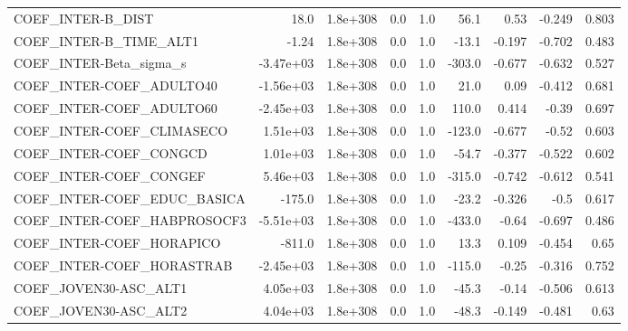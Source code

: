 \begin{tabular}{lrrrrrrrr}
COEF\_INTER-B\_DIST                 &        18.0 &     1.8e+308 &     0.0 &      1.0 &       56.1 &        0.53 &       -0.249 &         0.803 \\
COEF\_INTER-B\_TIME\_ALT1            &       -1.24 &     1.8e+308 &     0.0 &      1.0 &      -13.1 &      -0.197 &       -0.702 &         0.483 \\
COEF\_INTER-Beta\_sigma\_s           &   -3.47e+03 &     1.8e+308 &     0.0 &      1.0 &     -303.0 &      -0.677 &       -0.632 &         0.527 \\
COEF\_INTER-COEF\_ADULTO40          &   -1.56e+03 &     1.8e+308 &     0.0 &      1.0 &       21.0 &        0.09 &       -0.412 &         0.681 \\
COEF\_INTER-COEF\_ADULTO60          &   -2.45e+03 &     1.8e+308 &     0.0 &      1.0 &      110.0 &       0.414 &        -0.39 &         0.697 \\
COEF\_INTER-COEF\_CLIMASECO         &    1.51e+03 &     1.8e+308 &     0.0 &      1.0 &     -123.0 &      -0.677 &        -0.52 &         0.603 \\
COEF\_INTER-COEF\_CONGCD            &    1.01e+03 &     1.8e+308 &     0.0 &      1.0 &      -54.7 &      -0.377 &       -0.522 &         0.602 \\
COEF\_INTER-COEF\_CONGEF            &    5.46e+03 &     1.8e+308 &     0.0 &      1.0 &     -315.0 &      -0.742 &       -0.612 &         0.541 \\
COEF\_INTER-COEF\_EDUC\_BASICA       &      -175.0 &     1.8e+308 &     0.0 &      1.0 &      -23.2 &      -0.326 &         -0.5 &         0.617 \\
COEF\_INTER-COEF\_HABPROSOCF3       &   -5.51e+03 &     1.8e+308 &     0.0 &      1.0 &     -433.0 &       -0.64 &       -0.697 &         0.486 \\
COEF\_INTER-COEF\_HORAPICO          &      -811.0 &     1.8e+308 &     0.0 &      1.0 &       13.3 &       0.109 &       -0.454 &          0.65 \\
COEF\_INTER-COEF\_HORASTRAB         &   -2.45e+03 &     1.8e+308 &     0.0 &      1.0 &     -115.0 &       -0.25 &       -0.316 &         0.752 \\
COEF\_JOVEN30-ASC\_ALT1             &    4.05e+03 &     1.8e+308 &     0.0 &      1.0 &      -45.3 &       -0.14 &       -0.506 &         0.613 \\
COEF\_JOVEN30-ASC\_ALT2             &    4.04e+03 &     1.8e+308 &     0.0 &      1.0 &      -48.3 &      -0.149 &       -0.481 &          0.63 \\

\end{tabular}
